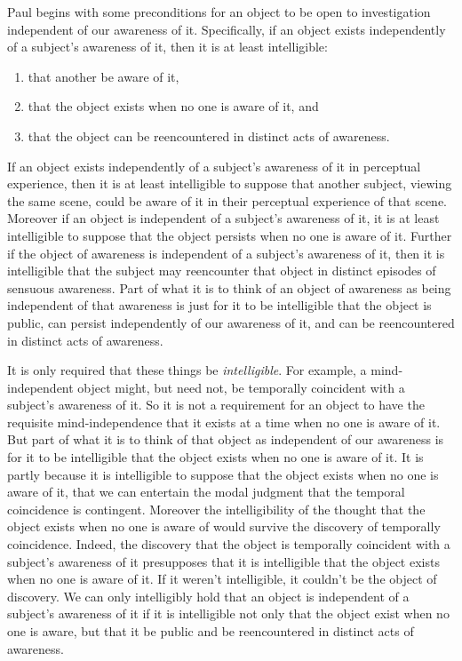 \documentclass[11pt]{article}
\begin{document}
Paul begins with some preconditions for an object to be open to investigation independent of our awareness of it. Specifically, if an object exists independently of a subject's awareness of it, then it is at least intelligible:
\begin{enumerate}
    \item that another be aware of it,
    \item that the object exists when no one is aware of it, and
    \item that the object can be reencountered in distinct acts of awareness.
\end{enumerate}
If an object exists independently of a subject's awareness of it in perceptual experience, then it is at least intelligible to suppose that another subject, viewing the same scene, could be aware of it in their perceptual experience of that scene. Moreover if an object is independent of a subject's awareness of it, it is at least intelligible to suppose that the object persists when no one is aware of it. Further if the object of awareness is independent of a subject's awareness of it, then it is intelligible that the subject may reencounter that object in distinct episodes of sensuous awareness. Part of what it is to think of an object of awareness as being independent of that awareness is just for it to be intelligible that the object is public, can persist independently of our awareness of it, and can be reencountered in distinct acts of awareness. 

It is only required that these things be \emph{intelligible}. For example, a mind-independent object might, but need not, be temporally coincident with a subject's awareness of it. So it is not a requirement for an object to have the requisite mind-independence that it exists at a time when no one is aware of it. But part of what it is to think of that object as independent of our awareness is for it to be intelligible that the object exists when no one is aware of it. It is partly because it is intelligible to suppose that the object exists when no one is aware of it, that we can entertain the modal judgment that the temporal coincidence is contingent. Moreover the intelligibility of the thought that the object exists when no one is aware of would survive the discovery of temporally coincidence. Indeed, the discovery that the object is temporally coincident with a subject's awareness of it presupposes that it is intelligible that the object exists when no one is aware of it. If it weren't intelligible, it couldn't be the object of discovery. We can only intelligibly hold that an object is independent of a subject's awareness of it if it is intelligible not only that the object exist when no one is aware, but that it be public and be reencountered in distinct acts of awareness.
\end{document}
